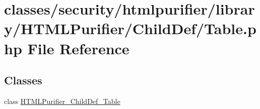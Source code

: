 \hypertarget{Table_8php}{\section{classes/security/htmlpurifier/library/\+H\+T\+M\+L\+Purifier/\+Child\+Def/\+Table.php File Reference}
\label{Table_8php}
}
\subsection*{Classes}
\begin{DoxyCompactItemize}
\item 
class \hyperlink{classHTMLPurifier__ChildDef__Table}{H\+T\+M\+L\+Purifier\+\_\+\+Child\+Def\+\_\+\+Table}
\end{DoxyCompactItemize}
